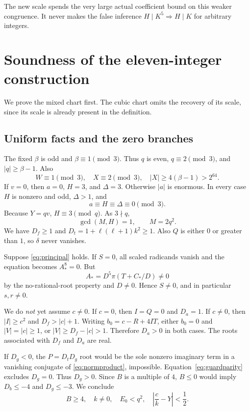 \documentclass[11pt]{article}
\theoremstyle{definition}
\theoremstyle{remark}
\begin{document}
The new scale spends the very large actual coefficient bound on this
weaker congruence. It never makes the false inference
$H\mid K^5\Rightarrow H\mid K$ for arbitrary integers.

\section{Soundness of the eleven-integer construction}
\label{sec:soundness}

We prove the mixed chart first. The cubic chart omits the recovery
of its scale, since its scale is already present in the definition.

\subsection{Uniform facts and the zero branches}
The fixed $\beta$ is odd and $\beta\equiv1\pmod3$. Thus $q$ is
even, $q\equiv2\pmod3$, and $|q|\ge\beta-1$. Also
\[
 W\equiv1\pmod3,\quad X\equiv2\pmod3,\quad
 |X|\ge4(\beta-1)>2^{64}.
\]
If $v=0$, then $a=0$, $H=3$, and $\Delta=3$. Otherwise $|a|$
is enormous. In every case $H$ is nonzero and odd, $\Delta>1$, and
\[
 a\equiv H\equiv\Delta\equiv0\pmod3.
\]
Because $Y=qv$, $H\equiv3\pmod q$. As $3\nmid q$,
\begin{equation}\label{eq:MHcoprime}
 \gcd(M,H)=1,\qquad M=2q^2.
\end{equation}
We have $D_f\ge1$ and
$D_t=1+\ell(\ell+1)k^2\ge1$. Also $Q$ is either $0$ or
greater than $1$, so $\delta$ never vanishes.

Suppose \eqref{eq:principal} holds. If $S=0$, all scaled radicands
vanish and the equation becomes $A_*^8=0$. But
\[
 A_*=D^5\pi(T+C_*/D)\ne0
\]
by the no-rational-root property and $D\ne0$. Hence $S\ne0$,
and in particular $s,r\ne0$.

We do \emph{not} yet assume $c\ne0$. If $c=0$, then $I=Q=0$
and $D_a=1$. If $c\ne0$, then $|I|\ge c^2$ and
$D_f>|c|+1$. Writing $b_0=c-R+4IT$, either $b_0=0$ and
$|V|=|c|\ge1$, or $|V|\ge D_f-|c|>1$. Therefore $D_a>0$
in both cases. The roots associated with $D_f$ and $D_a$ are real.

If $D_g<0$, the $P=D_tD_g$ root would be the sole nonzero imaginary
term in a vanishing conjugate of \eqref{eq:normproduct}, impossible.
Equation~\eqref{eq:guardparity} excludes $D_g=0$. Thus $D_g>0$.
Since $B$ is a multiple of $4$, $B\le0$ would imply $D_b\le-4$
and $D_g\le-3$. We conclude
\begin{equation}\label{eq:budgetpositive}
 B\ge4,\quad k\ne0,\quad E_0<q^2,\quad
 \left|\frac{c}{k}-Y\right|<\frac12.
\end{equation}
\end{document}
